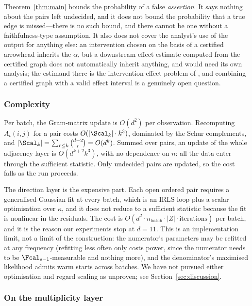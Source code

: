 \begin{remark}
Theorem~\ref{thm:main} bounds the probability of a false \emph{assertion}. It
says nothing about the pairs left undecided, and it does not bound the
probability that a true edge is missed---there is no such bound, and there
cannot be one without a faithfulness-type assumption. It also does not cover
the analyst's use of the output for anything else: an intervention chosen on
the basis of a certified arrowhead inherits the $\alpha$, but a downstream
effect estimate computed from the certified graph does not automatically
inherit anything, and would need its own analysis; the estimand there is the intervention-effect
problem of \citet{maathuis2009estimating}, and combining a certified graph
with a valid effect interval is a genuinely open question.
\end{remark}

\subsubsection{Complexity}\label{sec:complexity}

Per batch, the Gram-matrix update is $O(d^2)$ per observation. Recomputing
$A_t(i,j)$ for a pair costs $O(|\Scal_k| \cdot k^3)$, dominated by the Schur
complements, and $|\Scal_k| = \sum_{r \le k}\binom{d-2}{r} = O(d^k)$. Summed
over pairs, an update of the whole adjacency layer is $O(d^{k+2} k^3)$, with
no dependence on $n$: all the data enter through the sufficient statistic.
Only undecided pairs are updated, so the cost falls as the run proceeds.

The direction layer is the expensive part. Each open ordered pair requires a
generalised-Gaussian fit at every batch, which is an IRLS loop plus a scalar
optimisation over $\kappa$, and it does not reduce to a sufficient statistic
because the fit is nonlinear in the residuals. The cost is $O(d^2 \cdot
n_{\text{batch}} \cdot |Z| \cdot \text{iterations})$ per batch, and it is the
reason our experiments stop at $d = 11$. This is an implementation limit, not
a limit of the construction: the numerator's parameters may be refitted at any
frequency (refitting less often only costs power, since the numerator needs to
be $\Fcal_{s-1}$-measurable and nothing more), and the denominator's maximised
likelihood admits warm starts across batches. We have not pursued either
optimisation and regard scaling as unproven; see Section~\ref{sec:discussion}.

\subsubsection{On the multiplicity layer}\label{sec:multiplicity}

